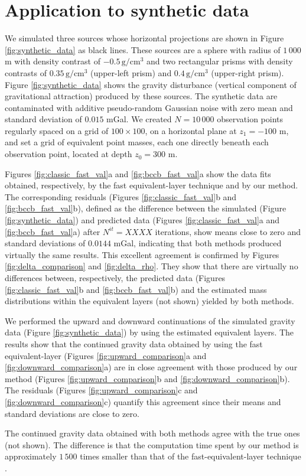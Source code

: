 \section{Application to synthetic data}

We simulated three sources whose horizontal projections are shown in Figure \ref{fig:synthetic_data} as black lines. 
These sources are a sphere with radius of $1\,000$ m with density contrast of 
$-0.5\, \mathrm{g/cm^3}$ and two rectangular prisms with density contrasts of $0.35\, \mathrm{g/cm^3}$ (upper-left prism) 
and $0.4\, \mathrm{g/cm^3}$ (upper-right prism). 
Figure \ref{fig:synthetic_data} shows the gravity disturbance (vertical component of gravitational attraction) 
produced by these sources. The synthetic data are contaminated with additive pseudo-random Gaussian 
noise with zero mean and standard deviation of $0.015$ mGal.
We created $N = 10\,000$ observation points regularly spaced on a grid of $100 \times 100$, on a 
horizontal plane at $z_{1} = -100$ m, and set a grid of equivalent point masses, each one directly beneath each 
observation point, located at depth $z_{0} = 300$ m. 

Figures \ref{fig:classic_fast_val}a and \ref{fig:bccb_fast_val}a show the data fits 
obtained, respectively, by the fast equivalent-layer technique \citep{siqueira-etal2017} 
and by our method. The corresponding residuals (Figures \ref{fig:classic_fast_val}b 
and \ref{fig:bccb_fast_val}b), defined as the difference between the simulated (Figure \ref{fig:synthetic_data}) 
and predicted data (Figures \ref{fig:classic_fast_val}a and \ref{fig:bccb_fast_val}a) after $N^{it} = XXXX$ iterations, 
show means close to zero and standard deviations of $0.0144$ mGal, indicating that both methods produced virtually 
the same results.
This excellent agreement is confirmed by Figures \ref{fig:delta_comparison} and 
\ref{fig:delta_rho}. They show that there are virtually no differences between, respectively, 
the predicted data (Figures \ref{fig:classic_fast_val}b and \ref{fig:bccb_fast_val}b) and the 
estimated mass distributions within the equivalent layers (not shown) yielded by 
both methods. 

We performed the upward and downward continuations of the simulated gravity data 
(Figure \ref{fig:synthetic_data}) by using the estimated equivalent layers.
The results show that the continued gravity data obtained by using the 
fast equivalent-layer (Figures \ref{fig:upward_comparison}a and \ref{fig:downward_comparison}a) 
are in close agreement with those produced by our method (Figures \ref{fig:upward_comparison}b and 
\ref{fig:downward_comparison}b). The residuals (Figures \ref{fig:upward_comparison}c and \ref{fig:downward_comparison}c)
quantify this agreement since their means and standard deviations are close to zero. 

The continued gravity data obtained with both methods agree with the true ones (not shown).
The difference is that the computation time spent by our method is 
approximately $1\,500$ times smaller than that of the fast-equivalent-layer 
technique \citep{siqueira-etal2017}. 